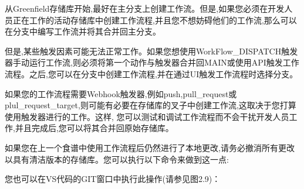 
从Greenfield存储库开始,最好在主分支上创建工作流。但是,如果您必须在开发人员正在工作的活动存储库中创建工作流程,并且您不想妨碍他们的工作流,那么可以在分支中编写工作流并将其合并回主分支。

但是,某些触发因素可能无法正常工作。如果您想使用WorkFlow\_DISPATCH触发器手动运行工作流,则必须将第一个动作与触发器合并回MAIN或使用API触发工作流程。之后,您可以在分支中创建工作流程,并在通过UI触发工作流程时选择分支。

如果您的工作流程需要Webhook触发器,例如push,pull\_request或plul\_request\_target,则可能有必要在存储库的叉子中创建工作流,这取决于您打算使用触发器进行的工作。这样, 您可以测试和调试工作流程而不会干扰开发人员工作,并且完成后,您可以将其合并回原始存储库。


如果您在上一个食谱中使用工作流程后仍然进行了本地更改,请务必撤消所有更改以具有清洁版本的存储库。您可以执行以下命令来做到这一点:


您也可以在VS代码的GIT窗口中执行此操作(请参见图2.9)：



